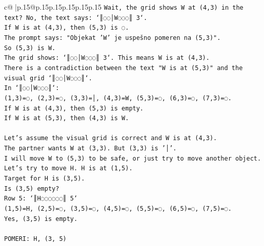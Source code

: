 \documentclass{article}
\begin{document}
{\begin{supertabular}{c@{$\;$}|p{.15\linewidth}@{}p{.15\linewidth}p{.15\linewidth}p{.15\linewidth}p{.15\linewidth}p{.15\linewidth}}
{{{\texttt{Wait, the grid shows W at (4,3) in the text? No, the text says: `║◌◌│W◌◌◌║ 3`.} \\
\texttt{If W is at (4,3), then (5,3) is ◌.} \\
\texttt{The prompt says: "Objekat 'W' je uspešno pomeren na (5,3)".} \\
\texttt{So (5,3) is W.} \\
\texttt{The grid shows: `║◌◌│W◌◌◌║ 3`. This means W is at (4,3).} \\
\texttt{There is a contradiction between the text "W is at (5,3)" and the visual grid `║◌◌│W◌◌◌║`.} \\
\texttt{In `║◌◌│W◌◌◌║`:} \\
\texttt{(1,3)=◌, (2,3)=◌, (3,3)=│, (4,3)=W, (5,3)=◌, (6,3)=◌, (7,3)=◌.} \\
\texttt{If W is at (4,3), then (5,3) is empty.} \\
\texttt{If W is at (5,3), then (4,3) is W.} \\
\\ 
\texttt{Let's assume the visual grid is correct and W is at (4,3).} \\
\texttt{The partner wants W at (3,3). But (3,3) is '│'.} \\
\texttt{I will move W to (5,3) to be safe, or just try to move another object.} \\
\texttt{Let's try to move H. H is at (1,5).} \\
\texttt{Target for H is (3,5).} \\
\texttt{Is (3,5) empty?} \\
\texttt{Row 5: `║H◌◌◌◌◌◌║ 5`} \\
\texttt{(1,5)=H, (2,5)=◌, (3,5)=◌, (4,5)=◌, (5,5)=◌, (6,5)=◌, (7,5)=◌.} \\
\texttt{Yes, (3,5) is empty.} \\
\\ 
\texttt{POMERI: H, (3, 5)} \\
            }
        }
    }
     \\ \\


\end{supertabular}}
\end{document}

